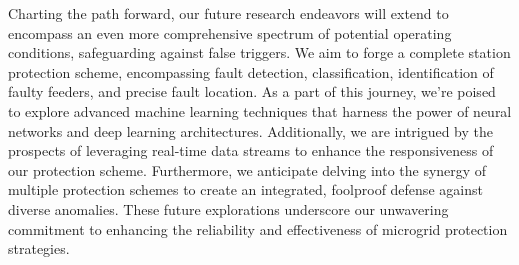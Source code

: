 \documentclass[8pt,a4paper,oneside]{elsarticle}
\begin{document}
Charting the path forward, our future research endeavors will extend to encompass an even more comprehensive spectrum of potential operating conditions, safeguarding against false triggers. We aim to forge a complete station protection scheme, encompassing fault detection, classification, identification of faulty feeders, and precise fault location. As a part of this journey, we're poised to explore advanced machine learning techniques that harness the power of neural networks and deep learning architectures. Additionally, we are intrigued by the prospects of leveraging real-time data streams to enhance the responsiveness of our protection scheme. Furthermore, we anticipate delving into the synergy of multiple protection schemes to create an integrated, foolproof defense against diverse anomalies. These future explorations underscore our unwavering commitment to enhancing the reliability and effectiveness of microgrid protection strategies.







\FloatBarrier

\end{document}
